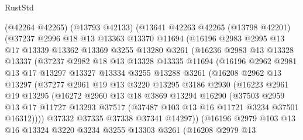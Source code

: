 \begin{lexlean}{RustStd}
\begin{coremodule}
        (@42264 @42265)
        (@13793 @42133)
        (@13641
          @42263
          @42265
          (@13798 @42201)
          (@37237
            @2996
            @18
            @13
            @13363
            @13370
            @11694
            (@16196
              @2983
              @2995
              @13
              @17
              @13339
              @13362
              @13369
              @3255
              @13280
              @3261
              (@16236
                @2983
                @13
                @13328
                @13337
                (@37237
                  @2982
                  @18
                  @13
                  @13328
                  @13335
                  @11694
                  (@16196
                    @2962
                    @2981
                    @13
                    @17
                    @13297
                    @13327
                    @13334
                    @3255
                    @13288
                    @3261
                    (@16208
                      @2962
                      @13
                      @13297
                      (@37277
                        @2961
                        @19
                        @13
                        @3220
                        @13295
                        @3186
                        @2930
                        (@16223
                          @2961
                          @19
                          @13295
                          (@16272
                            @2960
                            @13
                            @18
                            @3869
                            @13294
                            @16290
                            (@37503
                              @2959
                              @13
                              @17
                              @11727
                              @13293
                              @37517
                              (@37487 @103 @13 @16 @11721 @3234 @37501 @16312))))
                        @37332
                        @37335
                        @37338
                        @37341
                        @14297))
                    (@16196
                      @2979
                      @103
                      @13
                      @16
                      @13324
                      @3220
                      @3234
                      @3255
                      @13303
                      @3261
                      (@16208
                        @2979
                        @13

\end{coremodule}
\end{lexlean}
